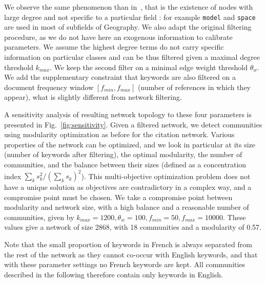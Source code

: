 We observe the same phenomenon than in~\cite{bergeaud2017classifying}, that is the existence of nodes with large degree and not specific to a particular field : for example \texttt{model} and \texttt{space} are used in most of subfields of Geography. We also adapt the original filtering procedure, as we do not have here an exogenous information to calibrate parameters. We assume the highest degree terms do not carry specific information on particular classes and can be thus filtered given a maximal degree threshold $k_{max}$. We keep the second filter on a minimal edge weight threshold $\theta_w$. We add the supplementary constraint that keywords are also filtered on a document frequency window $\left[ f_{min},f_{max} \right]$ (number of references in which they appear), what is slightly different from network filtering.

A sensitivity analysis of resulting network topology to these four parameters is presented in Fig.~\ref{fig:sensitivity}. Given a filtered network, we detect communities using modularity optimization as before for the citation network. Various properties of the network can be optimized, and we look in particular at its size (number of keywords after filtering), the optimal modularity, the number of communities, and the balance between their sizes (defined as a concentration index $\sum_k s_k^2 / (\sum_k s_k)^2$). This multi-objective optimization problem does not have a unique solution as objectives are contradictory in a complex way, and a compromise point must be chosen. We take a compromise point between modularity and network size, with a high balance and a reasonable number of communities, given by $k_{max} = 1200, \theta_w = 100, f_{min} = 50, f_{max} = 10000$. These values give a network of size 2868, with 18 communities and a modularity of 0.57.


Note that the small proportion of keywords in French is always separated from the rest of the network as they cannot co-occur with English keywords, and that with these parameter settings no French keywords are kept. All communities described in the following therefore contain only keywords in English.




